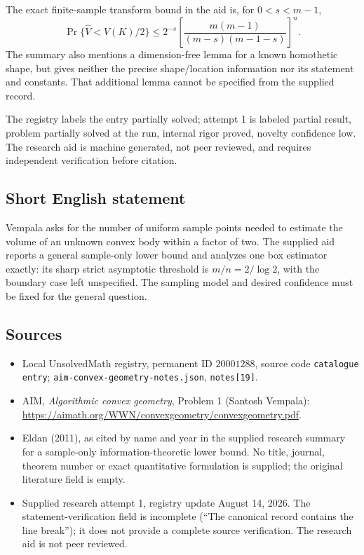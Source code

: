 \documentclass[11pt]{article}
\begin{document}
The exact finite-sample transform bound in the aid is, for \(0<s<m-1\),
\[
\Pr\{\widehat V<V(K)/2\}\le2^{-s}\left[\frac{m(m-1)}{(m-s)(m-1-s)}\right]^n.
\]
The summary also mentions a dimension-free lemma for a known homothetic shape, but gives neither the precise shape/location information nor its statement and constants. That additional lemma cannot be specified from the supplied record.

The registry labels the entry partially solved; attempt 1 is labeled partial result, problem partially solved at the run, internal rigor proved, novelty confidence low. The research aid is machine generated, not peer reviewed, and requires independent verification before citation.
\subsection{Short English statement}
Vempala asks for the number of uniform sample points needed to estimate the volume of an unknown convex body within a factor of two. The supplied aid reports a general sample-only lower bound and analyzes one box estimator exactly: its sharp strict asymptotic threshold is \(m/n=2/\log2\), with the boundary case left unspecified. The sampling model and desired confidence must be fixed for the general question.
\subsection{Sources}
\begin{itemize}
\item Local UnsolvedMath registry, permanent ID \(20001288\), source code \texttt{catalogue entry}; \texttt{aim-convex-geometry-notes.json}, \texttt{notes[19]}.
\item AIM, \emph{Algorithmic convex geometry}, Problem 1 (Santosh Vempala): \url{https://aimath.org/WWN/convexgeometry/convexgeometry.pdf}.
\item Eldan (2011), as cited by name and year in the supplied research summary for a sample-only information-theoretic lower bound. No title, journal, theorem number or exact quantitative formulation is supplied; the original literature field is empty.
\item Supplied research attempt 1, registry update August 14, 2026. The statement-verification field is incomplete (``The canonical record contains the line break''); it does not provide a complete source verification. The research aid is not peer reviewed.
\end{itemize}
\end{document}
